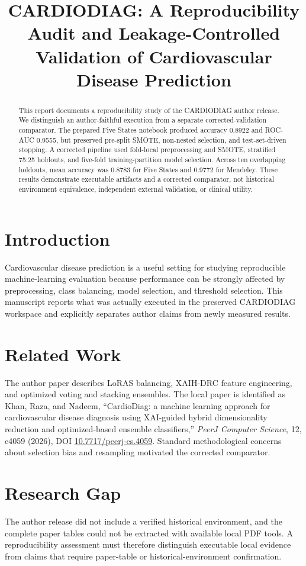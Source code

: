 \documentclass[11pt]{article}
\title{CARDIODIAG: A Reproducibility Audit and Leakage-Controlled Validation of Cardiovascular Disease Prediction}
\author{}
\date{}
\begin{document}
\maketitle

\begin{abstract}
This report documents a reproducibility study of the CARDIODIAG author release. We distinguish an author-faithful execution from a separate corrected-validation comparator. The prepared Five States notebook produced accuracy 0.8922 and ROC-AUC 0.9555, but preserved pre-split SMOTE, non-nested selection, and test-set-driven stopping. A corrected pipeline used fold-local preprocessing and SMOTE, stratified 75:25 holdouts, and five-fold training-partition model selection. Across ten overlapping holdouts, mean accuracy was 0.8783 for Five States and 0.9772 for Mendeley. These results demonstrate executable artifacts and a corrected comparator, not historical environment equivalence, independent external validation, or clinical utility.
\end{abstract}

\section{Introduction}
Cardiovascular disease prediction is a useful setting for studying reproducible machine-learning evaluation because performance can be strongly affected by preprocessing, class balancing, model selection, and threshold selection. This manuscript reports what was actually executed in the preserved CARDIODIAG workspace and explicitly separates author claims from newly measured results.

\section{Related Work}
The author paper describes LoRAS balancing, XAIH-DRC feature engineering, and optimized voting and stacking ensembles. The local paper is identified as Khan, Raza, and Nadeem, ``CardioDiag: a machine learning approach for cardiovascular disease diagnosis using XAI-guided hybrid dimensionality reduction and optimized-based ensemble classifiers,'' \emph{PeerJ Computer Science}, 12, e4059 (2026), DOI \href{https://doi.org/10.7717/peerj-cs.4059}{10.7717/peerj-cs.4059}. Standard methodological concerns about selection bias and resampling motivated the corrected comparator.

\section{Research Gap}
The author release did not include a verified historical environment, and the complete paper tables could not be extracted with available local PDF tools. A reproducibility assessment must therefore distinguish executable local evidence from claims that require paper-table or historical-environment confirmation.
\end{document}
